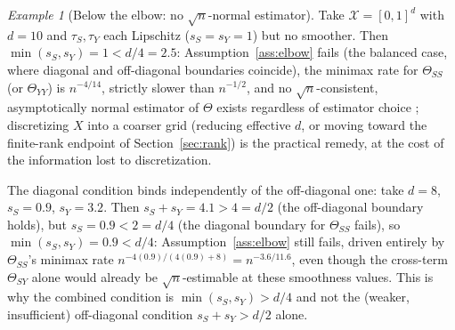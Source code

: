 \documentclass[11pt]{article}
\theoremstyle{plain}
\theoremstyle{definition}
\theoremstyle{remark}
\newtheorem{example}[theorem]{Example}
\newcommand{\cX}{\mathcal{X}}
\begin{document}
\begin{example}[Below the elbow: no $\sqrt n$-normal estimator]\label{ex:below-elbow}
Take $\cX=[0,1]^d$ with $d=10$ and $\tau_S,\tau_Y$ each Lipschitz ($s_S=s_Y=1$) but no
smoother. Then $\min(s_S,s_Y)=1<d/4=2.5$: Assumption~\ref{ass:elbow} fails (the
balanced case, where diagonal and off-diagonal boundaries coincide), the minimax
rate for $\Theta_{SS}$ (or $\Theta_{YY}$) is $n^{-4/14}$, strictly slower than
$n^{-1/2}$, and no $\sqrt n$-consistent, asymptotically normal estimator of $\Theta$
exists regardless of estimator choice \citep{BickelRitov1988,Robins2008HOIF};
discretizing $X$ into a coarser grid (reducing effective $d$, or moving toward the
finite-rank endpoint of Section~\ref{sec:rank}) is the practical remedy, at the cost
of the information lost to discretization.

The diagonal condition binds independently of the off-diagonal one: take $d=8$,
$s_S=0.9$, $s_Y=3.2$. Then $s_S+s_Y=4.1>4=d/2$ (the off-diagonal boundary holds),
but $s_S=0.9<2=d/4$ (the diagonal boundary for $\Theta_{SS}$ fails), so
$\min(s_S,s_Y)=0.9<d/4$: Assumption~\ref{ass:elbow} still fails, driven entirely by
$\Theta_{SS}$'s minimax rate $n^{-4(0.9)/(4(0.9)+8)}=n^{-3.6/11.6}$, even though the
cross-term $\Theta_{SY}$ alone would already be $\sqrt n$-estimable at these
smoothness values. This is why the combined condition is $\min(s_S,s_Y)>d/4$ and not
the (weaker, insufficient) off-diagonal condition $s_S+s_Y>d/2$ alone.
\end{example}
\end{document}
